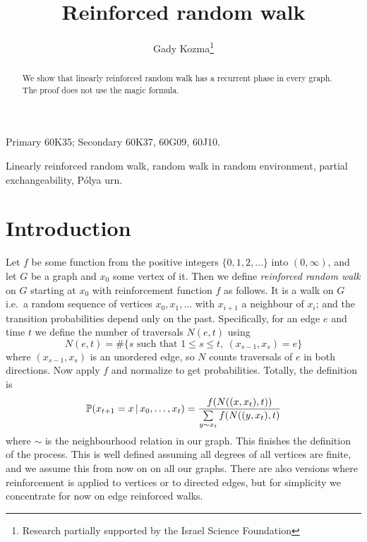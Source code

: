 \documentclass{emsprocart}
\title{Reinforced random walk}
\author[Gady Kozma]{Gady Kozma\thanks{Research partially
    supported by the Israel Science Foundation}}
\theoremstyle{plain}
\begin{document}
\begin{abstract}
We show that linearly reinforced random walk has a recurrent phase in
every graph. The proof does not use the magic formula. 
\end{abstract}

\begin{classification}
Primary 60K35; Secondary 60K37, 60G09, 60J10.
\end{classification}

\begin{keywords}
Linearly reinforced random walk, random walk in random environment,
partial exchangeability, P\'olya urn.
\end{keywords}

\maketitle

\section{Introduction}
Let $f$ be some function from the positive integers $\{0,1,2,\dotsc\}$
into $(0,\infty)$, and let $G$ be a graph and $x_{0}$ some vertex
of it. Then we define \emph{reinforced random walk} on $G$ starting
at $x_{0}$ with reinforcement function $f$ as follows. It is a walk
on $G$ i.e.\ a random sequence of vertices $x_{0},x_{1},\dotsc$
with $x_{i+1}$ a neighbour of $x_{i}$; and the transition probabilities
depend only on the past. Specifically, for an edge $e$ and time $t$
we define the number of traversals $N(e,t)$ using
\[
N(e,t)=\#\{s\mbox{ such that }1\le s\le t,\:(x_{s-1},x_{s})=e\}
\]
where $(x_{s-1},x_{s})$ is an unordered edge, so $N$ counts traversals
of $e$ in both directions. Now apply $f$ and normalize to get probabilities.
Totally, the definition is
\[
\mathbb{P}(x_{t+1}=x\,|\, x_{0},\dotsc,x_{t})=\frac{f(N((x,x_{t}),t))}{\sum\limits _{\smash{y\sim x_{t}}}f(N((y,x_{t}),t)}
\]
where $\sim$ is the neighbourhood relation in our graph. This finishes
the definition of the process. This is well defined assuming all degrees
of all vertices are finite, and we assume this from now on on all
our graphs. There are also versions where reinforcement is applied
to vertices or to directed edges, but for simplicity we concentrate
for now on edge reinforced walks.
\end{document}
